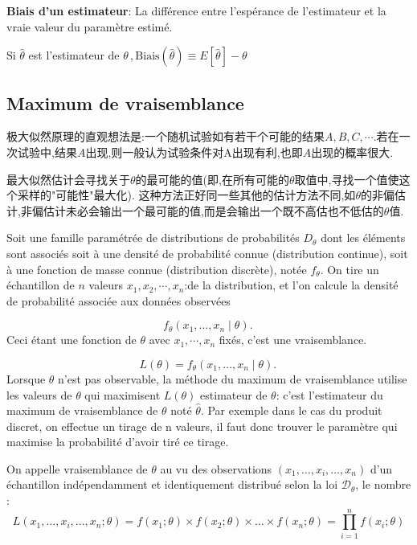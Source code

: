 \documentclass{article}
\begin{document}
\begin{definition}
\textbf{Biais d'un estimateur}:
La diff\'erence entre l'esp\'erance de l'estimateur et la vraie valeur du param\`etre estim\'e.

Si $\hat \theta$ est l'estimateur de $\theta\,,  \text{Biais}(\hat\theta)\equiv E[\hat\theta]-\theta$
\end{definition}

\subsection{Maximum de vraisemblance}
极大似然原理的直观想法是:一个随机试验如有若干个可能的结果$A,B,C,\cdots$.若在一次试验中,结果$A$出现,则一般认为试验条件对A出现有利,也即$A$出现的概率很大.

最大似然估计会寻找关于$\theta$的最可能的值(即,在所有可能的$\theta$取值中,寻找一个值使这个采样的"可能性"最大化).
这种方法正好同一些其他的估计方法不同,如$\theta$的非偏估计,非偏估计未必会输出一个最可能的值,而是会输出一个既不高估也不低估的$\theta$值.

Soit une famille param\'etr\'ee de distributions de probabilit\'es $D_{\theta}$ dont les \'el\'ements sont associ\'es soit
\`a une densit\'e de probabilit\'e connue (distribution continue), soit \`a une fonction de masse connue (distribution discr\`ete), not\'ee $f_{\theta}$.
On tire un \'echantillon de $n$ valeurs $x_1, x_2, \cdots, x_n$:de la distribution,
et l'on calcule la densit\'e de probabilit\'e associ\'ee aux donn\'ees observ\'ees

$$ f_\theta(x_1,\dots,x_n \mid \theta).\, $$
Ceci \'etant une fonction de $\theta$ avec $x_1, \cdots, x_n$ fix\'es, c'est une vraisemblance.

$$ L(\theta) = f_\theta(x_1,\dots,x_n \mid \theta).\, $$
Lorsque $\theta$ n'est pas observable, la m\'ethode du maximum de vraisemblance utilise les valeurs de $\theta$ qui
maximisent $L(\theta)$ estimateur de $\theta$: c'est l'estimateur du maximum de vraisemblance de $\theta$ not\'e $\widehat{\theta}$.
Par exemple dans le cas du produit discret, on effectue un tirage de n valeurs,
il faut donc trouver le param\`etre qui maximise la probabilit\'e d'avoir tir\'e ce tirage.

\bigskip
On appelle vraisemblance de $\theta$ au vu des observations $(x_1, \ldots,x_i, \ldots, x_n)$ d'un \'echantillon ind\'ependamment et identiquement distribu\'e
selon la loi $\mathcal{D}_\theta$, le nombre :
$$ L(x_1, \ldots,x_i, \ldots,x_n;\theta) = f(x_1;\theta) \times f(x_2;\theta) \times \ldots \times f(x_n;\theta) = \prod_{i=1}^n f(x_i;\theta) $$
\end{document}

